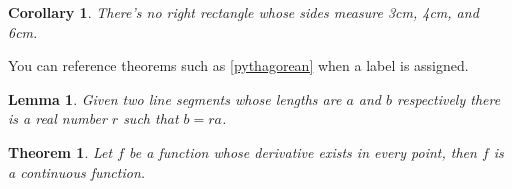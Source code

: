 \documentclass[12pt,ngerman]{scrreprt}
\newtheorem{theorem}{Theorem}[chapter]
\newtheorem{corollary}{Corollary}[chapter]
\newtheorem{lemma}{Lemma}[chapter]
\begin{document}
\begin{corollary}
There's no right rectangle whose sides measure 3cm, 4cm, and 6cm.
\end{corollary}

You can reference theorems such as \ref{pythagorean} when a label is assigned.

\begin{lemma}
Given two line segments whose lengths are \(a\) and \(b\) respectively there is a 
real number \(r\) such that \(b=ra\).
\end{lemma}

\begin{theorem}
Let \(f\) be a function whose derivative exists in every point, then \(f\) is 
a continuous function.
\end{theorem}
\end{document}
